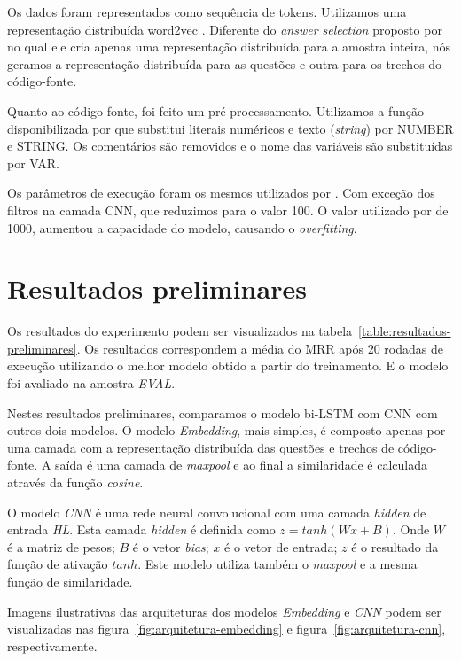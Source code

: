 \documentclass[12pt]{article}
\begin{document}
Os dados foram representados como sequência de tokens. Utilizamos uma representação distribuída word2vec \cite{mikolov-word2vec-2013}. Diferente do \textit{answer selection} proposto por \cite{tan-lstm-qa} no qual ele cria apenas uma representação distribuída para a amostra inteira, nós geramos a representação distribuída para as questões e outra para os trechos do código-fonte.

Quanto ao código-fonte, foi feito um pré-processamento. Utilizamos a função disponibilizada por \cite{Yao-staqc:2018} que substitui literais numéricos e texto (\textit{string}) por NUMBER e STRING. Os comentários são removidos e o nome das variáveis são substituídas por VAR.

Os parâmetros de execução foram os mesmos utilizados por \cite{tan-lstm-qa}. Com exceção dos filtros na camada CNN, que reduzimos para o valor 100. O valor utilizado por \cite{tan-lstm-qa} de 1000, aumentou a capacidade do modelo, causando o \textit{overfitting}.




\section{Resultados preliminares}\label{sec:resultados-preliminares}

Os resultados do experimento podem ser visualizados na tabela~\ref{table:resultados-preliminares}. Os resultados correspondem a média do MRR após 20 rodadas de execução utilizando o melhor modelo obtido a partir do treinamento. E o modelo foi avaliado na amostra \emph{EVAL}. 

Nestes resultados preliminares, comparamos o modelo bi-LSTM com CNN com outros dois modelos. O modelo \emph{Embedding}, mais simples, é composto apenas por uma camada com a representação distribuída das questões e trechos de código-fonte. A saída é uma camada de \textit{maxpool} e ao final a similaridade é calculada através da função \textit{cosine}. 

O modelo \emph{CNN} é uma rede neural convolucional com uma camada \textit{hidden} de entrada \emph{HL}. Esta camada \textit{hidden}  é definida como $z = tanh(Wx +B)$. Onde $W$ é a matriz de pesos; $B$ é o vetor \textit{bias}; $x$ é o vetor de entrada; $z$ é o resultado da função de ativação $tanh$.  Este modelo utiliza também o \textit{maxpool} e a mesma função de similaridade.

Imagens ilustrativas das arquiteturas dos modelos \emph{Embedding} e \emph{CNN} podem ser visualizadas nas figura~\ref{fig:arquitetura-embedding} e figura~\ref{fig:arquitetura-cnn}, respectivamente.
\end{document}

